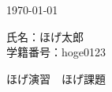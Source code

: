 \documentclass[lualatex]{jlreq}
\begin{document}
\begin{flushleft}
  \today
\end{flushleft}

\begin{flushright}
  氏名：ほげ太郎\\ 学籍番号：hoge0123
\end{flushright}
\vspace{2\zh}

\begin{center}
  {\Large ほげ演習　ほげ課題}
\end{center}
\vspace{3\zh}




\end{document}
